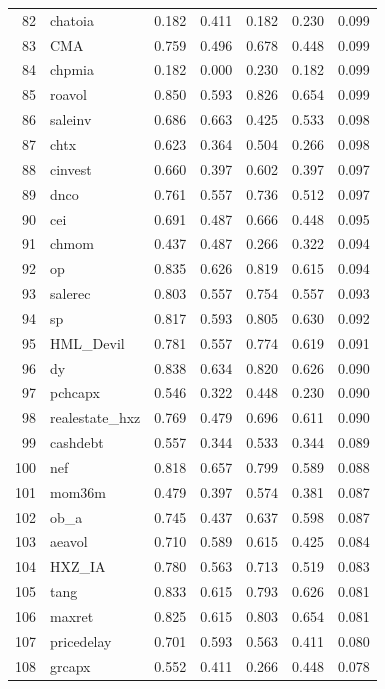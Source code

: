 \begin{footnotesize}
\begin{longtable}{rl|c|c|c|c|c}
		82 & chatoia & 0.182 & 0.411 & 0.182 & 0.230 & 0.099 \\ 
		83 & CMA & 0.759 & 0.496 & 0.678 & 0.448 & 0.099 \\ 
		84 & chpmia & 0.182 & 0.000 & 0.230 & 0.182 & 0.099 \\ 
		85 & roavol & 0.850 & 0.593 & 0.826 & 0.654 & 0.099 \\ 
		86 & saleinv & 0.686 & 0.663 & 0.425 & 0.533 & 0.098 \\ 
		87 & chtx & 0.623 & 0.364 & 0.504 & 0.266 & 0.098 \\ 
		88 & cinvest & 0.660 & 0.397 & 0.602 & 0.397 & 0.097 \\ 
		89 & dnco & 0.761 & 0.557 & 0.736 & 0.512 & 0.097 \\ 
		90 & cei & 0.691 & 0.487 & 0.666 & 0.448 & 0.095 \\ 
		91 & chmom & 0.437 & 0.487 & 0.266 & 0.322 & 0.094 \\ 
		92 & op & 0.835 & 0.626 & 0.819 & 0.615 & 0.094 \\ 
		93 & salerec & 0.803 & 0.557 & 0.754 & 0.557 & 0.093 \\ 
		94 & sp & 0.817 & 0.593 & 0.805 & 0.630 & 0.092 \\ 
		95 & HML\_Devil & 0.781 & 0.557 & 0.774 & 0.619 & 0.091 \\ 
		96 & dy & 0.838 & 0.634 & 0.820 & 0.626 & 0.090 \\ 
		97 & pchcapx & 0.546 & 0.322 & 0.448 & 0.230 & 0.090 \\ 
		98 & realestate\_hxz & 0.769 & 0.479 & 0.696 & 0.611 & 0.090 \\ 
		99 & cashdebt & 0.557 & 0.344 & 0.533 & 0.344 & 0.089 \\ 
		100 & nef & 0.818 & 0.657 & 0.799 & 0.589 & 0.088 \\ 
		101 & mom36m & 0.479 & 0.397 & 0.574 & 0.381 & 0.087 \\ 
		102 & ob\_a & 0.745 & 0.437 & 0.637 & 0.598 & 0.087 \\ 
		103 & aeavol & 0.710 & 0.589 & 0.615 & 0.425 & 0.084 \\ 
		104 & HXZ\_IA & 0.780 & 0.563 & 0.713 & 0.519 & 0.083 \\ 
		105 & tang & 0.833 & 0.615 & 0.793 & 0.626 & 0.081 \\ 
		106 & maxret & 0.825 & 0.615 & 0.803 & 0.654 & 0.081 \\ 
		107 & pricedelay & 0.701 & 0.593 & 0.563 & 0.411 & 0.080 \\ 
		108 & grcapx & 0.552 & 0.411 & 0.266 & 0.448 & 0.078 \\ 

\end{longtable}
\end{footnotesize}

